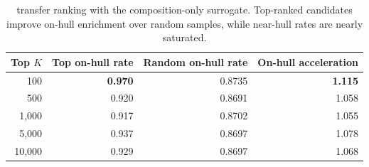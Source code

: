 \begin{table}[t]
    \centering
    \caption{\gnome transfer ranking with the composition-only \mpdata surrogate. Top-ranked candidates improve on-hull enrichment over random samples, while near-hull rates are nearly saturated.}
    \label{tab:gnome_transfer}
    \begin{tabular}{@{}rrrr@{}}
        \toprule
        Top $K$ & Top on-hull rate & Random on-hull rate & On-hull acceleration \\
        \midrule
        100 & {\bf 0.970} & 0.8735 & {\bf 1.115} \\
        500 & 0.920 & 0.8691 & 1.058 \\
        1,000 & 0.917 & 0.8702 & 1.055 \\
        5,000 & 0.937 & 0.8697 & 1.078 \\
        10,000 & 0.929 & 0.8697 & 1.068 \\
        \bottomrule
    \end{tabular}
\end{table}
